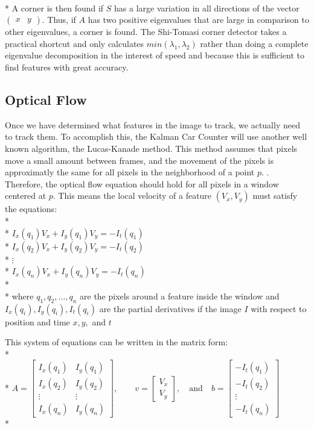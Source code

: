 \documentclass[draft]{article} %
\begin{document}
\\*
A corner is then found if $S$ has a large variation in all directions of the vector $\begin{pmatrix} x & y \end{pmatrix}$. Thus, if $A$ has two positive eigenvalues that are large in comparison to other eigenvalues, a corner is found. \cite{tommasini1998making} The Shi-Tomasi corner detector takes a practical shortcut and only calculates $min(\lambda_1, \lambda_2)$ rather than doing a complete eigenvalue decomposition in the interest of speed and because this is sufficient to find features with great accuracy. \cite{Shi94}

\subsection{Optical Flow}
Once we have determined what features in the image to track, we actually need to track them. To accomplish this, the Kalman Car Counter will use another well known algorithm, the Lucas-Kanade method. This method assumes that pixels move a small amount between frames, and the movement of the pixels is approximatly the same for all pixels in the neighborhood of a point $p$. \cite{lucas1981iterative}. Therefore, the optical flow equation should hold for all pixels in a window centered at $p$. This means the local velocity of a feature $(V_x,V_y)$ must satisfy the equations:\\*\\*
$I_x(q_1) V_x + I_y (q_1) V_y = -I_t(q_1)$\\*
$I_x(q_2) V_x + I_y (q_2) V_y = -I_t(q_2)$\\*
$\vdots$\\*
$I_x(q_n) V_x + I_y (q_n) V_y = -I_t(q_n)$\\*\\*
where $q_1,q_2,\dots,q_n$ are the pixels around a feature inside the window and $I_x(q_i),I_y(q_i),I_t(q_i)$ are the partial derivatives if the image $I$ with respect to position and time $x,y,$ and $t$

This system of equations can be written in the matrix form:\\*\\*
$A = \begin{bmatrix}
I_x(q_1) & I_y(q_1) \\[10pt]
I_x(q_2) & I_y(q_2) \\[10pt]
\vdots  & \vdots  \\[10pt]
I_x(q_n) & I_y(q_n) 
\end{bmatrix},
\quad\quad
v = 
\begin{bmatrix}
V_x\\[10pt]
V_y
\end{bmatrix},
\quad \mbox{and}\quad
b = 
\begin{bmatrix}
-I_t(q_1) \\[10pt]
-I_t(q_2) \\[10pt]
\vdots  \\[10pt]
-I_t(q_n)
\end{bmatrix}
$\\*
\end{document}
